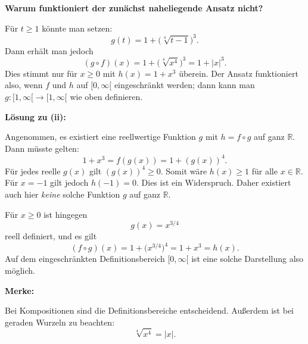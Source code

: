 \textbf{Warum funktioniert der zunächst naheliegende Ansatz nicht?}

Für $t\geq1$ könnte man setzen:
\[
g(t)=1+\bigl(\sqrt[4]{t-1}\bigr)^3.
\]
Dann erhält man jedoch
\[
(g\circ f)(x)=1+\bigl(\sqrt[4]{x^4}\bigr)^3
=1+|x|^3.
\]
Dies stimmt nur für $x\geq0$ mit $h(x)=1+x^3$ überein.
Der Ansatz funktioniert also, wenn $f$ und $h$ auf
$[0,\infty[$ eingeschränkt werden; dann kann man
$g:[1,\infty[\rightarrow[1,\infty[$ wie oben definieren.

\textbf{Lösung zu (ii):}

Angenommen, es existiert eine reellwertige Funktion $g$
mit $h=f\circ g$ auf ganz $\mathbb R$. Dann müsste gelten:
\[
1+x^3=f(g(x))=1+(g(x))^4.
\]
Für jedes reelle $g(x)$ gilt $(g(x))^4\geq0$.
Somit wäre $h(x)\geq1$ für alle $x\in\mathbb R$.
Für $x=-1$ gilt jedoch $h(-1)=0$. Dies ist ein Widerspruch.
Daher existiert auch hier \emph{keine} solche Funktion $g$
auf ganz $\mathbb R$.

Für $x\geq0$ ist hingegen
\[
g(x)=x^{3/4}
\]
reell definiert, und es gilt
\[
(f\circ g)(x)=1+\bigl(x^{3/4}\bigr)^4
=1+x^3=h(x).
\]
Auf dem eingeschränkten Definitionsbereich $[0,\infty[$
ist eine solche Darstellung also möglich.

\textbf{Merke:}

Bei Kompositionen sind die Definitionsbereiche entscheidend.
Außerdem ist bei geraden Wurzeln zu beachten:
\[
\sqrt[4]{x^4}=|x|.
\]
